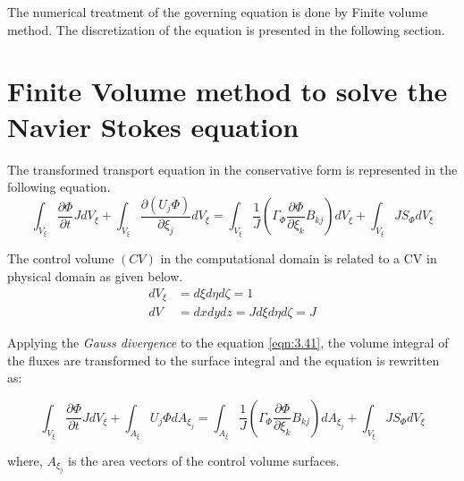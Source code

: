 The numerical treatment of the governing equation is done by Finite volume method. The discretization of the equation is presented in the following section.

\section{Finite Volume method to solve the Navier Stokes equation}

The transformed transport equation in the conservative form is represented in the following equation. 
\begin{equation}
\int_{V_{\xi}} \frac{\partial \Phi}{\partial t}J dV_{\xi} + \int_{V_{\xi}} \frac{\partial \left(U_j \Phi\right)}{\partial \xi_j} dV_{\xi} = \int_{V_{\xi}} \frac{1}{J} \left(\Gamma_{\Phi} \frac{\partial \Phi}{\partial \xi_k} B_{kj} \right) dV_{\xi} + \int_{V_{\xi}} JS_{\Phi} dV_{\xi}
\label{eqn:3.41}
\end{equation}

The control volume $\left(CV\right)$ in the computational domain is related to a CV in physical domain as given below.
\begin{align}
dV_{\xi} &= d \xi d \eta d \zeta = 1\\
dV &= dx dy dz = J d \xi d \eta d \zeta = J
\label{eqn:3.43}
\end{align}

Applying the \textit{Gauss divergence} to the equation \ref{eqn:3.41}, the volume integral of the fluxes are transformed to the surface integral and the equation is rewritten as: 

\begin{equation}
\int_{V_{\xi}} \frac{\partial \Phi}{\partial t}J dV_{\xi} + \int_{A_{\xi}} U_j \Phi dA_{{\xi}_j} = \int_{A_{\xi}} \frac{1}{J} \left(\Gamma_{\Phi} \frac{\partial \Phi}{\partial \xi_k} B_{kj} \right) dA_{{\xi}_j} + \int_{V_{\xi}} JS_{\Phi} dV_{\xi}
\label{eqn:3.44}
\end{equation}

where, $A_{{\xi}_j}$ is the area vectors of the control volume surfaces. 


